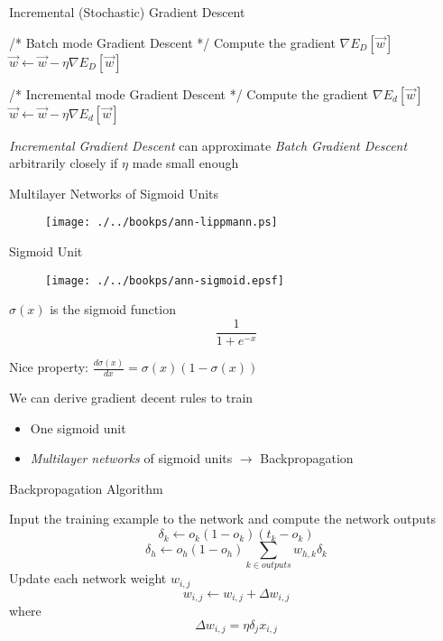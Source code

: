 \documentclass[%
pdf,
colorBG,
slideColor,
tcrico,
]{prosper}
\begin{document}
\begin{slide}{ Incremental (Stochastic) Gradient Descent  } 
\tiny 
\begin{algorithm}[H]
/* Batch mode Gradient Descent */ \;
{
	Compute the gradient $\nabla E_{D}[\vec{w}]$ \;
	$\vec{w} \leftarrow \vec{w} -\eta \nabla E_{D}[\vec{w}] $ \;
}
\end{algorithm}

\tiny
\begin{algorithm}[H]
/* Incremental mode Gradient Descent */ \;
{
	{
	 Compute the gradient $\nabla E_{d}[\vec{w}]$ \;
	$\vec{w} \leftarrow \vec{w} -\eta \nabla E_{d}[\vec{w}] $ \;
	}
}
\end{algorithm}

{\em Incremental Gradient Descent} can approximate {\em Batch Gradient
Descent} arbitrarily closely if $\eta$ made small enough
\end{slide}

\begin{slide}{  Multilayer Networks of Sigmoid Units  } 
\begin{figure}
	\centering
	\texttt{[image: ./../bookps/ann-lippmann.ps]}
\end{figure}
\end{slide}


\begin{slide}{  Sigmoid Unit  } 
\begin{figure}
	\centering
	\texttt{[image: ./../bookps/ann-sigmoid.epsf]}
\end{figure}
\tiny
$\sigma(x)$ is the sigmoid function 
\[ \frac{1}{1 + e^{-x}} \]

Nice property: $\frac{d \sigma(x)}{dx} = \sigma(x) (1 - \sigma(x))$

We can derive gradient decent rules to train
\begin{itemize}
\item One sigmoid unit
\item {\em Multilayer networks} of sigmoid units $\rightarrow$ Backpropagation
\end{itemize}
\end{slide}


\begin{slide}{  Backpropagation Algorithm  } 
\tiny
\begin{algorithm}[H]
{
	{
	Input the training example to the network and compute the network outputs
	{
		\[ \delta_{k} \leftarrow o_{k}(1-o_{k})(t_{k}-o_{k}) \]
	}
	{
		\[ \delta_{h} \leftarrow o_{h}(1-o_{h})\sum_{k \in outputs}w_{h,k}\delta_{k} \]
	}
	Update each network weight $w_{i,j}$ \;
	\[w_{i,j} \leftarrow w_{i,j} + \Delta w_{i,j} \]
	where
	\[ \Delta w_{i,j} = \eta \delta_{j} x_{i,j} \]
	}
}
\end{algorithm}
\end{slide}
\end{document}
